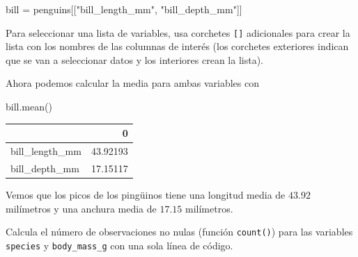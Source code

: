 \documentclass[
  a4paper,
  noprof,
  12pt,
  notoc,
  nosols,
  nobib]{mnye}
\newenvironment{Shaded}{\begin{snugshade}}{\end{snugshade}}
\newcommand{\NormalTok}[1]{\textcolor[rgb]{0.00,0.23,0.31}{#1}}
\newcommand{\OperatorTok}[1]{\textcolor[rgb]{0.37,0.37,0.37}{#1}}
\newcommand{\StringTok}[1]{\textcolor[rgb]{0.13,0.47,0.30}{#1}}
\renewenvironment{exercise}[1][]{
            \if\relax\detokenize{#1}\relax
                \ex
            \else
                \ex[note={#1}]
            \fi
        }{\endex}
\theoremstyle{definition}
\newtheorem{exercise}{Ejercicio}[section]
\theoremstyle{remark}
\begin{document}
\begin{Shaded}
\begin{Highlighting}[]
\NormalTok{bill }\OperatorTok{=}\NormalTok{ penguins[[}\StringTok{"bill\_length\_mm"}\NormalTok{, }\StringTok{"bill\_depth\_mm"}\NormalTok{]]}
\end{Highlighting}
\end{Shaded}

\begin{tcolorbox}[enhanced jigsaw, arc=.35mm, colback=white, colframe=quarto-callout-note-color-frame, breakable, opacityback=0, bottomrule=.15mm, rightrule=.15mm, left=2mm, toprule=.15mm, leftrule=.75mm]
\begin{minipage}[t]{5.5mm}
\textcolor{quarto-callout-note-color}{\faInfo}
\end{minipage}%
\begin{minipage}[t]{\textwidth - 5.5mm}

Para seleccionar una lista de variables, usa corchetes \texttt{{[}{]}}
adicionales para crear la lista con los nombres de las columnas de
interés (los corchetes exteriores indican que se van a seleccionar datos
y los interiores crean la lista).

\end{minipage}%
\end{tcolorbox}

Ahora podemos calcular la media para ambas variables con

\begin{Shaded}
\begin{Highlighting}[]
\NormalTok{bill.mean()}
\end{Highlighting}
\end{Shaded}

\begin{tabular}{lr}
\toprule
{} &         0 \\
\midrule
bill\_length\_mm &  43.92193 \\
bill\_depth\_mm  &  17.15117 \\
\bottomrule
\end{tabular}

Vemos que los picos de los pingüinos tiene una longitud media de
\(43.92\) milímetros y una anchura media de \(17.15\) milímetros.

\begin{exercise}[]%
\protect\hypertarget{exr-subset-variables-3}{}\label{exr-subset-variables-3}%
Calcula el número de observaciones no nulas (función \texttt{count()})
para las variables \texttt{species} y \texttt{body\_mass\_g} con una
sola línea de código.

\end{exercise}
\end{document}
